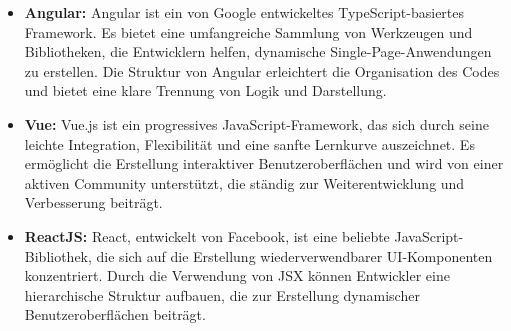 \begin{itemize}

    \item \textbf{Angular:} Angular ist ein von Google entwickeltes TypeScript-basiertes Framework. Es bietet eine umfangreiche Sammlung von Werkzeugen und Bibliotheken, die Entwicklern helfen, dynamische Single-Page-Anwendungen zu erstellen. Die Struktur von Angular erleichtert die Organisation des Codes und bietet eine klare Trennung von Logik und Darstellung.\cite{angular}

    \item \textbf{Vue:} Vue.js ist ein progressives JavaScript-Framework, das sich durch seine leichte Integration, Flexibilität und eine sanfte Lernkurve auszeichnet. Es ermöglicht die Erstellung interaktiver Benutzeroberflächen und wird von einer aktiven Community unterstützt, die ständig zur Weiterentwicklung und Verbesserung beiträgt.\cite{vuejs}

    \item \textbf{ReactJS:} React, entwickelt von Facebook, ist eine beliebte JavaScript-Bibliothek, die sich auf die Erstellung wiederverwendbarer \acf{UI}-Komponenten konzentriert. Durch die Verwendung von \acf{JSX} können Entwickler eine hierarchische Struktur aufbauen, die zur Erstellung dynamischer Benutzeroberflächen beiträgt.\cite{reactjs}

\end{itemize}



